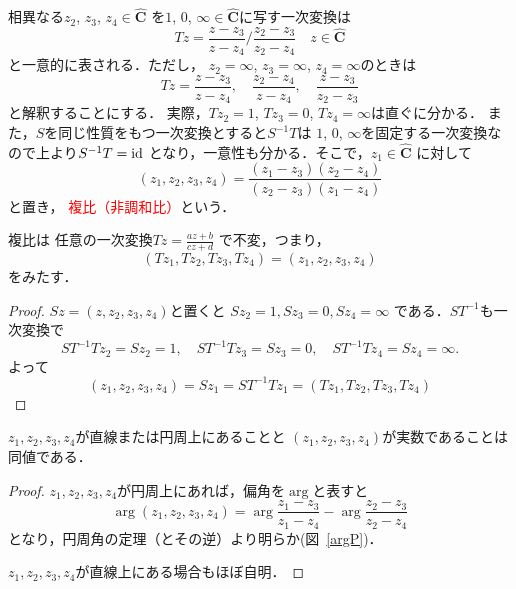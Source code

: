 相異なる$z_2$, $z_3$, $z_4\in 
\hat{\mathbf C}$
を$1$, $0$, $\infty\in 
\hat{\mathbf C} $に写す一次変換は
\[
	Tz=\frac{z-z_3}{z-z_4}/\frac{z_2-z_3}{z_2-z_4}
	\quad z\in  \hat{\mathbf C}
\]
と一意的に表される．ただし，
$z_2=\infty$, $z_3=\infty$, $z_4=\infty$のときは
\[
	Tz=\frac{z-z_3}{z-z_4}, \quad \frac{z_2-z_4}{z-z_4},\quad
	\frac{z-z_3}{z_2-z_3}
\]
と解釈することにする．
実際，$Tz_2=1$, $Tz_3=0$,  $Tz_4=\infty$は直ぐに分かる．
また，$S$を同じ性質をもつ一次変換とすると$S^{-1}T$は
$1$, $0$, $\infty$を固定する一次変換なので上より$S^{-1}T=\operatorname{id}$
となり，一意性も分かる．そこで，$z_1\in 
\hat{\mathbf C}$ に対して
\begin{equation}\label{crossRatio}
	(z_1,z_2,z_3,z_4)
	=
	\frac{(z_1-z_3)(z_2-z_4)}{(z_2-z_3)(z_1-z_4)}
\end{equation}
と置き，
\textcolor{red}{複比（非調和比）}という．
\begin{Thm}
複比は
任意の一次変換$Tz= \frac{az+b}{cz+d}$ で不変，つまり，
\[
	(Tz_1,Tz_2,Tz_3,Tz_4)
	=
	(z_1,z_2,z_3,z_4)
\]
をみたす．
\end{Thm}
\begin{proof}$Sz = (z,z_2,z_3,z_4)$と置くと
$
	S z_2 = 1,  Sz_3 = 0,  S z_4 = \infty
$
である．$ST^{-1}$も一次変換で
\[
	ST^{-1}Tz_2=Sz_2=1,\quad ST^{-1}Tz_3=Sz_3=0,\quad
	ST^{-1}Tz_4=Sz_4 = \infty. 
\]
よって
\[
	(z_1, z_2, z_3, z_4)
	=Sz_1
	=ST^{-1}Tz_1
	=(Tz_1,Tz_2,Tz_3,Tz_4)
\]
\end{proof}

\begin{Thm}
   $z_1,z_2,z_3,z_4$が直線または円周上にあることと
   $(z_1,z_2,z_3,z_4)$が実数であることは同値である．
\end{Thm}
\begin{proof}
$z_1,z_2,z_3,z_4$が円周上にあれば，偏角を$\arg$と表すと
\[
	\arg(z_1,z_2,z_3,z_4)
	=
	\arg\frac{z_1-z_3}{z_1-z_4}
	-\arg\frac{z_2-z_3}{z_2-z_4}
\]
となり，円周角の定理（とその逆）より明らか(図~\ref{argP})．

$z_1,z_2,z_3,z_4$が直線上にある場合もほぼ自明．
\end{proof}

